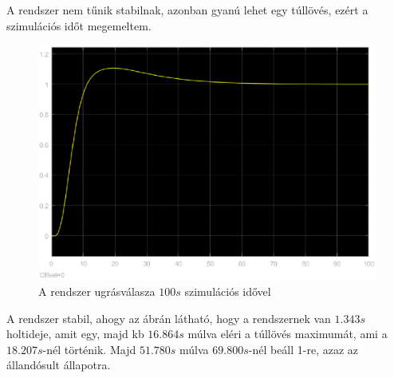 \documentclass[12pt]{article}
\begin{document}
A rendszer nem tűnik stabilnak, azonban gyanú lehet egy túllövés, ezért a szimulációs időt megemeltem.
\begin{figure}[H]
\centering
\includegraphics[scale=.70]{KESSLER100S}
\caption{A rendszer ugrásválasza $100s$ szimulációs idővel}
\end{figure}
A rendszer stabil, ahogy az ábrán látható, hogy a rendszernek van $1.343s$ holtideje, amit egy, majd kb $16.864s$ múlva eléri a túllövés maximumát, ami a $18.207s$-nél történik. Majd $51.780s$ múlva $69.800s$-nél beáll 1-re, azaz az állandósult állapotra.
\end{document}
